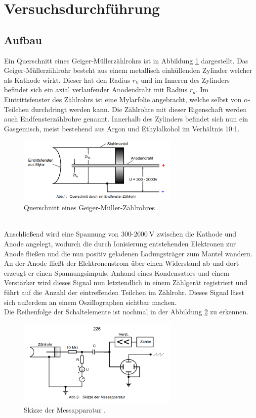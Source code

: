 \section{Versuchsdurchführung}
\subsection{Aufbau}
Ein Querschnitt eines Geiger-Müllerzählrohrs ist in Abbildung \ref{fig:geigermuellerpic} dargestellt.
Das Geiger-Müllerzählrohr besteht aus einem metallisch einhüllenden Zylinder welcher als Kathode wirkt. 
Dieser hat den Radius $r_{k}$ und im Inneren des Zylinders befindet sich ein axial verlaufender Anodendraht mit Radius $r_{a}$.
Im Eintrittsfenster des Zählrohrs ist eine Mylarfolie angebracht, welche selbst von $\alpha$-Teilchen durchdringt werden kann. Die Zählrohre mit dieser Eigenschaft
werden auch Endfensterzählrohre genannt.
Innerhalb des Zylinders befindet sich nun ein Gasgemisch, meist bestehend aus Argon und Ethylalkohol im Verhältnis 10:1.
\begin{figure}
  \centering
  \includegraphics[width=0.7\textwidth]{bilder/Abbildung.png}
  \caption{Querschnitt eines Geiger-Müller-Zählrohres \cite{ap03}.}
  \label{fig:geigermuellerpic}
\end{figure}
\\
Anschließend wird eine Spannung von $300$-$\SI{2000}{\volt}$ zwischen die Kathode und Anode angelegt, wodurch die durch Ionisierung entstehenden Elektronen zur Anode fließen
und die nun positiv geladenen Ladungsträger zum Mantel wandern. An der Anode fließt der Elektronenstrom über einen Widerstand ab und dort erzeugt er einen Spannungsimpuls.
Anhand eines Kondensators und einem Verstärker wird dieses Signal nun letztendlich in einem Zählgerät registriert und führt auf die Anzahl der eintreffenden Teilchen im Zählrohr.
Dieses Signal lässt sich außerdem an einem Oszillographen sichtbar machen.
\newline
\\
Die Reihenfolge der Schaltelemente ist nochmal in der Abbildung \ref{fig:geigermuellerpic2} zu erkennen.
\begin{figure}
  \centering
  \includegraphics[width=0.7\textwidth]{bilder/Abbildung2.png}
  \caption{Skizze der Messapparatur \cite{ap03}.}
  \label{fig:geigermuellerpic2}
\end{figure}

